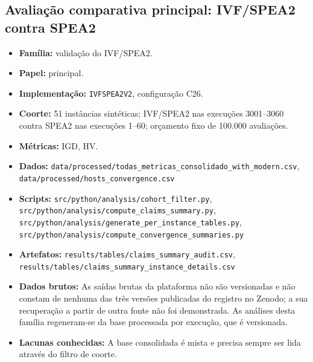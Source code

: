 \subsection*{Avaliação comparativa principal: IVF/SPEA2 contra SPEA2}
\begin{itemize}[nosep]\raggedright
    \item \textbf{Família:} validação do IVF/SPEA2.
    \item \textbf{Papel:} principal.
    \item \textbf{Implementação:} \texttt{IVFSPEA2V2}, configuração C26.
    \item \textbf{Coorte:} 51 instâncias sintéticas; IVF/SPEA2 nas execuções 3001--3060 contra SPEA2 nas execuções 1--60; orçamento fixo de 100.000 avaliações.
    \item \textbf{Métricas:} IGD, HV.
    \item \textbf{Dados:} \texttt{data/\allowbreak{}processed/\allowbreak{}todas\_\allowbreak{}metricas\_\allowbreak{}consolidado\_\allowbreak{}with\_\allowbreak{}modern.csv}, \texttt{data/\allowbreak{}processed/\allowbreak{}hosts\_\allowbreak{}convergence.csv}
    \item \textbf{Scripts:} \texttt{src/\allowbreak{}python/\allowbreak{}analysis/\allowbreak{}cohort\_\allowbreak{}filter.py}, \texttt{src/\allowbreak{}python/\allowbreak{}analysis/\allowbreak{}compute\_\allowbreak{}claims\_\allowbreak{}summary.py}, \texttt{src/\allowbreak{}python/\allowbreak{}analysis/\allowbreak{}generate\_\allowbreak{}per\_\allowbreak{}instance\_\allowbreak{}tables.py}, \texttt{src/\allowbreak{}python/\allowbreak{}analysis/\allowbreak{}compute\_\allowbreak{}convergence\_\allowbreak{}summaries.py}
    \item \textbf{Artefatos:} \texttt{results/\allowbreak{}tables/\allowbreak{}claims\_\allowbreak{}summary\_\allowbreak{}audit.csv}, \texttt{results/\allowbreak{}tables/\allowbreak{}claims\_\allowbreak{}summary\_\allowbreak{}instance\_\allowbreak{}details.csv}
    \item \textbf{Dados brutos:} As saídas brutas da plataforma não são versionadas e não constam de nenhuma das três versões publicadas do registro no Zenodo; a sua recuperação a partir de outra fonte não foi demonstrada. As análises desta família regeneram-se da base processada por execução, que é versionada.
    \item \textbf{Lacunas conhecidas:} A base consolidada é mista e precisa sempre ser lida através do filtro de coorte.
\end{itemize}

